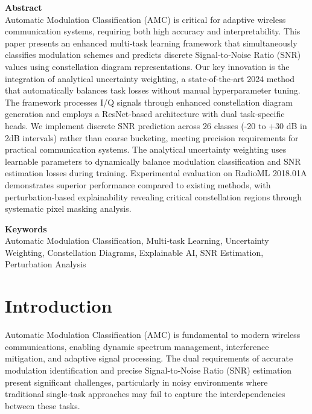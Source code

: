 \documentclass{ELSP}
\begin{document}
\vspace{0.5em}
\noindent\textbf{\textcolor[RGB]{0,131,255}{Abstract}}\\
Automatic Modulation Classification (AMC) is critical for adaptive wireless communication systems, requiring both high accuracy and interpretability. This paper presents an enhanced multi‑task learning framework that simultaneously classifies modulation schemes and predicts discrete Signal‑to‑Noise Ratio (SNR) values using constellation diagram representations. Our key innovation is the integration of analytical uncertainty weighting, a state‑of‑the‑art 2024 method that automatically balances task losses without manual hyperparameter tuning. The framework processes I/Q signals through enhanced constellation diagram generation and employs a ResNet‑based architecture with dual task‑specific heads. We implement discrete SNR prediction across 26 classes (-20 to +30 dB in 2dB intervals) rather than coarse bucketing, meeting precision requirements for practical communication systems. The analytical uncertainty weighting uses learnable parameters to dynamically balance modulation classification and SNR estimation losses during training. Experimental evaluation on RadioML 2018.01A demonstrates superior performance compared to existing methods, with perturbation‑based explainability revealing critical constellation regions through systematic pixel masking analysis.

\vspace{0.5em}
\noindent\textbf{\textcolor[RGB]{0,131,255}{Keywords}}\\
Automatic Modulation Classification, Multi‑task Learning, Uncertainty Weighting, Constellation Diagrams, Explainable AI, SNR Estimation, Perturbation Analysis

\section{Introduction}

Automatic Modulation Classification (AMC) \cite{thien2021survey} is fundamental to modern wireless communications, enabling dynamic spectrum management, interference mitigation, and adaptive signal processing. The dual requirements of accurate modulation identification and precise Signal‑to‑Noise Ratio (SNR) estimation present significant challenges, particularly in noisy environments where traditional single‑task approaches may fail to capture the interdependencies between these tasks.
\end{document}
